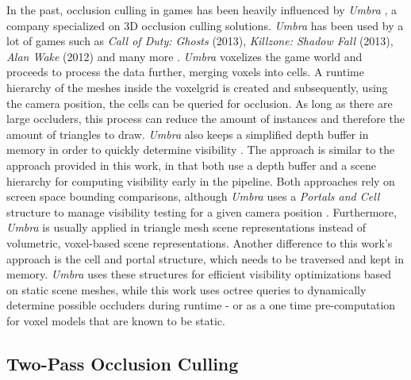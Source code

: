In the past, occlusion culling in games has been heavily influenced by \emph{Umbra} \cite{Umbra2024}, a company 
specialized on 3D occlusion culling solutions. \emph{Umbra} has been used by a lot of games such as 
\emph{Call of Duty: Ghosts} (2013), \emph{Killzone: Shadow Fall} (2013), \emph{Alan Wake} (2012) and many more 
\cite{UmbraWiki,CallOfDutyGhostsCredits,KillzoneUmbra,AlanWakeUmbra}. \emph{Umbra} voxelizes the game world and proceeds 
to process the data further, merging voxels into cells. A runtime hierarchy of the meshes inside the voxelgrid is created 
and subsequently, using the camera position, the cells can be queried for occlusion. As long as there are large 
occluders, this process can reduce the amount of instances and therefore the amount of triangles to draw. \emph{Umbra} 
also keeps a simplified depth buffer in memory in order to quickly determine visibility \cite{Medium2018}. The 
approach is similar to the approach provided in this work, in that both use a depth buffer and a scene hierarchy for 
computing visibility early in the pipeline. Both approaches rely on screen space bounding comparisons, although 
\emph{Umbra} uses a \emph{Portals and Cell} structure to manage visibility testing for a given camera position 
\cite{Medium2018}. Furthermore, \emph{Umbra} is usually applied in triangle mesh scene representations instead of 
volumetric, voxel-based scene representations. Another difference to this work's approach is the cell and portal 
structure, which needs to be traversed and kept in memory. \emph{Umbra} uses these structures for efficient 
visibility optimizations based on static scene meshes, while this work uses octree queries to dynamically determine 
possible occluders during runtime - or as a one time pre-computation for voxel models that are known to be static. \\



\subsection*{Two-Pass Occlusion Culling}

